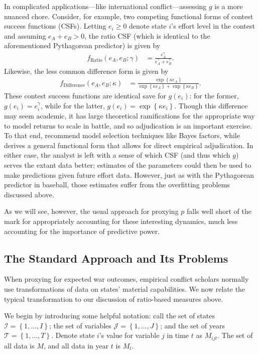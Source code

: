 In complicated applications---like international conflict---assessing $g$ is a more nuanced chore.  Consider, for example, two competing functional forms of contest success functions (CSFs).  Letting $e_i \geq 0$ denote state $i$'s effort level in the contest and assuming $e_A + e_B > 0$, the ratio CSF (which is identical to the aforementioned Pythagorean predictor) is given by
\begin{align*}
  f_\text{Ratio}(e_A,e_B; \gamma) &= \frac{e_A^\gamma}{e_A^\gamma + e_B^\gamma}.
\end{align*}
Likewise, the less common difference form is given by
\begin{align*}
  f_\text{Difference}(e_A,e_B;\kappa) &= \frac{\exp\left\{\kappa e_A\right\}}{\exp\left\{\kappa e_A\right\} + \exp\left\{\kappa e_B\right\}}.
\end{align*}
These contest success functions are identical save for $g(e_i)$:  for the former, $g(e_i) = e_i^\gamma$, while for the latter, $g(e_i) = \exp\left\{\kappa e_i\right\}$.  Though this difference may seem academic, it has large theoretical ramifications for the appropriate way to model returns to scale in battle, and so adjudication is an important exercise.  To that end, \citet{jia2013} recommend model selection techniques like Bayes factors, while \citet{hwang2012} derives a general functional form that allows for direct empirical adjudication.  In either case, the analyst is left with a sense of which CSF (and thus which $g$) serves the extant data better; estimates of the parameters could then be used to make predictions given future effort data.  However, just as with the Pythagorean predictor in baseball, those estimates suffer from the overfitting problems discussed above.

As we will see, however, the usual approach for proxying $p$ falls well short of the mark for appropriately accounting for these interesting dynamics, much less accounting for the importance of predictive power.

\subsection{The Standard Approach and Its Problems}
When proxying for expected war outcomes, empirical conflict scholars normally use transformations of data on states' material capabilities.  We now relate the typical transformation to our discussion of ratio-based measures above.

We begin by introducing some helpful notation:  call the set of states $\mathcal{I} = \left\{1, \ldots, I\right\}$; the set of variables $\mathcal{J} = \left\{1,\ldots,J\right\}$; and the set of years $\mathcal{T} = \left\{1,\ldots, T\right\}$.  Denote state $i$'s value for variable $j$ in time $t$ as $M_{ijt}$.  The set of all data is $M$, and all data in year $t$ is $M_t$.

